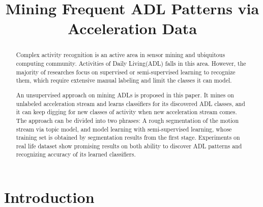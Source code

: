 \documentclass{sigchi}
\begin{document}
\title{Mining Frequent ADL Patterns via Acceleration Data}



\maketitle

\begin{abstract}
Complex activity recognition is an active area in sensor mining and ubiquitous computing community. 
Activities of Daily Living(ADL) falls in this area.
However, the majority of researches focus on supervised or semi-supervised learning to recognize them, which require extensive manual labeling and limit the classes it can model.

 An unsupervised approach on mining ADLs is proposed in this paper.
 It mines on unlabeled acceleration stream and learns classifiers for its discovered ADL classes, and it can keep digging for new classes of activity when new acceleration stream comes.
 The approach can be divided into two phrases:
 A rough segmentation of the motion stream via topic model, and model learning with semi-supervised learning, whose training set is obtained by segmentation results from the first stage.
 Experiments on real life dataset show promising results on both ability to discover ADL patterns and recognizing accuracy of its learned classifiers.
\end{abstract}


\section{Introduction}
\end{document}
